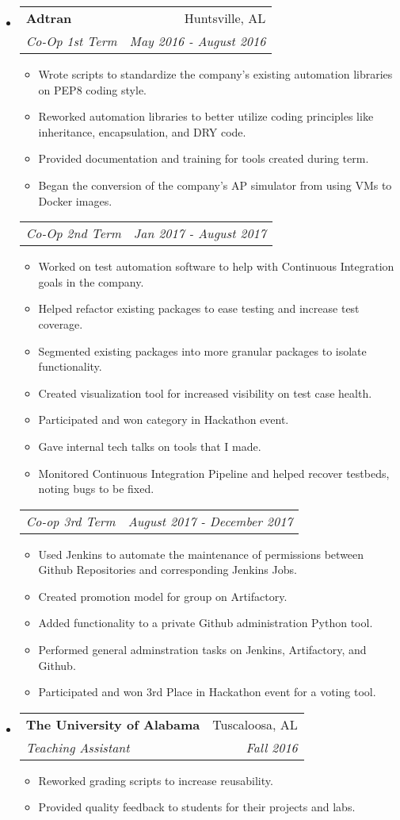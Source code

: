 \documentclass[letterpaper,10pt]{article}
\makeatletter
\newcommand{\resitem}[1]{\item #1 \vspace{-2pt}}
\newcommand{\ressubheading}[4]{
    \begin{tabular*}{6.5in}{l@{\cftdotfill{\cftsecdotsep}\extracolsep{\fill}}r}
      \textbf{#1} & #2 \\
      \textit{#3} & \textit{#4} \\
  \end{tabular*}\vspace{-6pt}}
\newcommand{\secondsubheading}[2]{
    \begin{tabular*}{6.5in}{l@{\cftdotfill{\cftsecdotsep}\extracolsep{\fill}}r}
      \textit{#1} & \textit{#2} \\
  \end{tabular*}\vspace{-6pt}}
\makeatother
\begin{document}

  \begin{itemize}

    \item
      \ressubheading{Adtran}{Huntsville, AL}{Co-Op 1st Term}{May 2016 - August 2016}
      \begin{itemize}
          \resitem{Wrote scripts to standardize the company's existing automation libraries on PEP8 coding style.}
          \resitem{Reworked automation libraries to better utilize coding principles like inheritance, encapsulation, and DRY code.}
          \resitem{Provided documentation and training for tools created during term.}
          \resitem{Began the conversion of the company's AP simulator from using VMs to Docker images.}
      \end{itemize}
      \secondsubheading{Co-Op 2nd Term}{Jan 2017 - August 2017}
      \begin{itemize}
          \resitem{Worked on test automation software to help with Continuous Integration goals in the company.}
          \resitem{Helped refactor existing packages to ease testing and increase test coverage.}
          \resitem{Segmented existing packages into more granular packages to isolate functionality.}
          \resitem{Created visualization tool for increased visibility on test case health.}
          \resitem{Participated and won category in Hackathon event.}
          \resitem{Gave internal tech talks on tools that I made.}
          \resitem{Monitored Continuous Integration Pipeline and helped recover testbeds, noting bugs to be fixed.}
      \end{itemize}
      \secondsubheading{Co-op 3rd Term}{August 2017 - December 2017}
      \begin{itemize}
          \resitem{Used Jenkins to automate the maintenance of permissions between Github
          Repositories and corresponding Jenkins Jobs.}
          \resitem{Created promotion model for group on Artifactory.}
          \resitem{Added functionality to a private Github administration Python tool.}
          \resitem{Performed general adminstration tasks on Jenkins, Artifactory, and Github.}
          \resitem{Participated and won 3rd Place in Hackathon event for a voting tool.}
      \end{itemize}

    \item
      \ressubheading{The University of Alabama}{Tuscaloosa, AL}{Teaching Assistant}{Fall 2016}
      \begin{itemize}
          \resitem{Reworked grading scripts to increase reusability.}
          \resitem{Provided quality feedback to students for their projects and labs.}
      \end{itemize}


\end{itemize}
\end{document}

